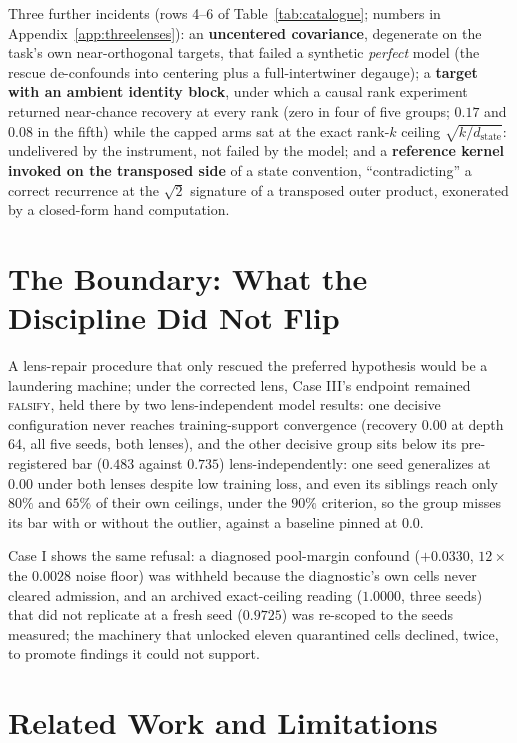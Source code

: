 \documentclass{article}
\newcommand{\dstate}{d_{\mathrm{state}}}
\begin{document}
 Three further incidents (rows 4--6 of Table~\ref{tab:catalogue};
numbers in Appendix~\ref{app:threelenses}): an
\textbf{uncentered covariance}, degenerate on the task's own
near-orthogonal targets, that failed a synthetic \emph{perfect} model
(the rescue de-confounds into centering plus a full-intertwiner
degauge);
a \textbf{target with an ambient identity block}, under which a
causal rank experiment returned near-chance
recovery at every rank (zero in four of five groups; $0.17$ and
$0.08$ in the fifth) while the capped arms sat at the exact rank-$k$
ceiling $\sqrt{k/\dstate}$: undelivered by the
instrument, not failed by the model;
and a \textbf{reference kernel invoked on the transposed side} of a
state convention, ``contradicting'' a correct recurrence at the
$\sqrt{2}$ signature of a transposed outer product, exonerated by a
closed-form hand computation.

\section{The Boundary: What the Discipline Did Not Flip}
\label{sec:notflipped}

 A lens-repair procedure that only rescued the preferred hypothesis
would be a laundering machine; under the corrected
lens, Case III's endpoint remained
\textsc{falsify}, held there by two lens-independent model results:
one decisive configuration never reaches training-support convergence
(recovery $0.00$ at depth 64, all five seeds, both
lenses), and the other decisive group sits below its pre-registered
bar ($0.483$ against $0.735$) lens-independently: one seed
generalizes at $0.00$ under both lenses despite low training loss,
and even its siblings reach only $80\%$ and $65\%$ of their own
ceilings, under the $90\%$ criterion, so the group misses its bar
with or without the outlier, against a baseline pinned at $0.0$.

Case I shows the same refusal: a diagnosed pool-margin confound
($+0.0330$, $12\times$ the $0.0028$ noise floor) was withheld because
the diagnostic's own cells never cleared admission, and an archived
exact-ceiling reading ($1.0000$, three seeds) that did not replicate
at a fresh seed ($0.9725$) was re-scoped to the seeds measured; the
machinery that unlocked eleven quarantined cells declined, twice, to
promote findings it could not support.

\section{Related Work and Limitations}
\label{sec:related}
\end{document}
